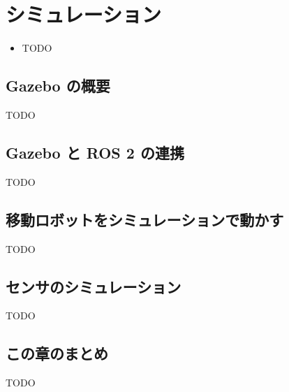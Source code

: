 \chapter{シミュレーション}
\label{chap:simulation}

\begin{goalbox}
  \begin{itemize}
    \item TODO
  \end{itemize}
\end{goalbox}

\section{Gazebo の概要}

TODO

\section{Gazebo と ROS 2 の連携}

TODO

\section{移動ロボットをシミュレーションで動かす}

TODO

\section{センサのシミュレーション}

TODO

\section*{この章のまとめ}

TODO
